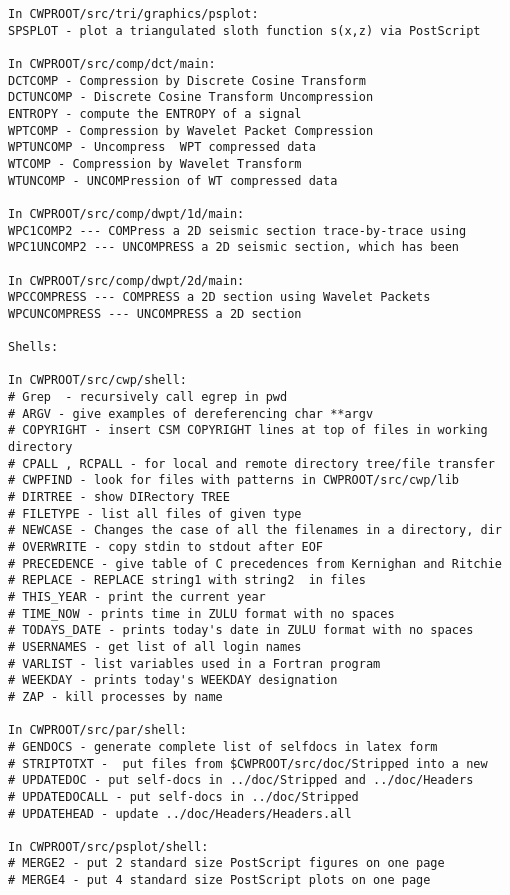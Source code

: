 {{\begin{verbatim}
In CWPROOT/src/tri/graphics/psplot:
SPSPLOT - plot a triangulated sloth function s(x,z) via PostScript	

In CWPROOT/src/comp/dct/main:
DCTCOMP - Compression by Discrete Cosine Transform			
DCTUNCOMP - Discrete Cosine Transform Uncompression 			
ENTROPY - compute the ENTROPY of a signal			
WPTCOMP - Compression by Wavelet Packet Compression 			
WPTUNCOMP - Uncompress  WPT compressed data				
WTCOMP - Compression by Wavelet Transform				
WTUNCOMP - UNCOMPression of WT compressed data			

In CWPROOT/src/comp/dwpt/1d/main:
WPC1COMP2 --- COMPress a 2D seismic section trace-by-trace using 	
WPC1UNCOMP2 --- UNCOMPRESS a 2D seismic section, which has been	

In CWPROOT/src/comp/dwpt/2d/main:
WPCCOMPRESS --- COMPRESS a 2D section using Wavelet Packets		
WPCUNCOMPRESS --- UNCOMPRESS a 2D section 				

Shells: 

In CWPROOT/src/cwp/shell:
# Grep  - recursively call egrep in pwd
# ARGV - give examples of dereferencing char **argv
# COPYRIGHT - insert CSM COPYRIGHT lines at top of files in working directory
# CPALL , RCPALL - for local and remote directory tree/file transfer
# CWPFIND - look for files with patterns in CWPROOT/src/cwp/lib
# DIRTREE - show DIRectory TREE
# FILETYPE - list all files of given type
# NEWCASE - Changes the case of all the filenames in a directory, dir
# OVERWRITE - copy stdin to stdout after EOF
# PRECEDENCE - give table of C precedences from Kernighan and Ritchie
# REPLACE - REPLACE string1 with string2  in files
# THIS_YEAR - print the current year
# TIME_NOW - prints time in ZULU format with no spaces 
# TODAYS_DATE - prints today's date in ZULU format with no spaces 
# USERNAMES - get list of all login names
# VARLIST - list variables used in a Fortran program
# WEEKDAY - prints today's WEEKDAY designation
# ZAP - kill processes by name

In CWPROOT/src/par/shell:
# GENDOCS - generate complete list of selfdocs in latex form
# STRIPTOTXT -  put files from $CWPROOT/src/doc/Stripped into a new
# UPDATEDOC - put self-docs in ../doc/Stripped and ../doc/Headers
# UPDATEDOCALL - put self-docs in ../doc/Stripped
# UPDATEHEAD - update ../doc/Headers/Headers.all

In CWPROOT/src/psplot/shell:
# MERGE2 - put 2 standard size PostScript figures on one page
# MERGE4 - put 4 standard size PostScript plots on one page


\end{verbatim}}}

